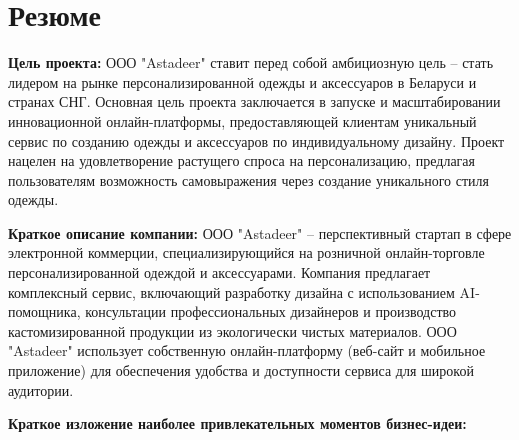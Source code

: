 \section{Резюме}

\textbf{Цель проекта:}  ООО "Astadeer" ставит перед собой амбициозную цель – стать лидером на рынке персонализированной одежды и аксессуаров в Беларуси и странах СНГ.  Основная цель проекта заключается в запуске и масштабировании инновационной онлайн-платформы, предоставляющей клиентам уникальный сервис по созданию одежды и аксессуаров по индивидуальному дизайну.  Проект нацелен на удовлетворение растущего спроса на персонализацию, предлагая пользователям возможность самовыражения через создание уникального стиля одежды.

\vspace{0.5cm}

\textbf{Краткое описание компании:} ООО "Astadeer" – перспективный стартап в сфере электронной коммерции, специализирующийся на розничной онлайн-торговле персонализированной одеждой и аксессуарами.  Компания предлагает комплексный сервис, включающий разработку дизайна с использованием AI-помощника, консультации профессиональных дизайнеров и производство кастомизированной продукции из экологически чистых материалов.  ООО "Astadeer" использует собственную онлайн-платформу (веб-сайт и мобильное приложение) для обеспечения удобства и доступности сервиса для широкой аудитории.

\vspace{0.5cm}

\textbf{Краткое изложение наиболее привлекательных моментов бизнес-идеи:}

